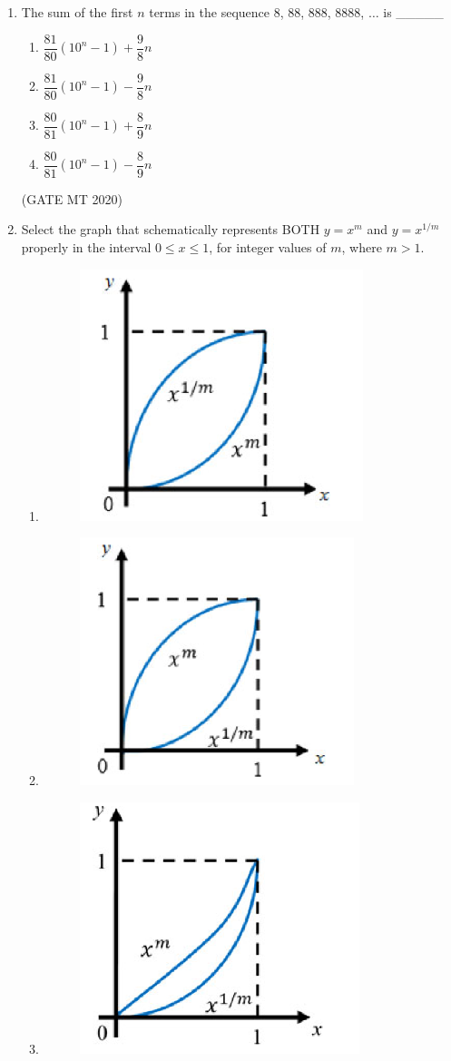 \documentclass[journal, 11pt, onecolumn]{IEEEtran}
\theoremstyle{remark}
\begin{document}
\begin{enumerate}
\item The sum of the first $n$ terms in the sequence 8, 88, 888, 8888, $\dots$ is \_\_\_\_\_

\begin{multicols}{2}
\begin{enumerate}
\item $\dfrac{81}{80}(10^{n}-1) + \dfrac{9}{8}n$  
\item $\dfrac{81}{80}(10^{n}-1) - \dfrac{9}{8}n$  
\item $\dfrac{80}{81}(10^{n}-1) + \dfrac{8}{9}n$  
\item $\dfrac{80}{81}(10^{n}-1) - \dfrac{8}{9}n$  
\end{enumerate}
\end{multicols}
\hfill(GATE MT 2020)

\item Select the graph that schematically represents BOTH $y = x^{m}$ and $y = x^{1/m}$ properly in the interval $0 \leq x \leq 1$, for integer values of $m$, where $m > 1$.
\begin{enumerate}
\item \begin{figure}[H]
    \centering
    \includegraphics[width=0.25\linewidth]{figs/image1''.png}
    \caption{}
    \label{fig:placeholder}
\end{figure}  
\item \begin{figure}[H]
    \centering
    \includegraphics[width=0.25\linewidth]{figs/image2''.png}
    \caption{}
    \label{fig:placeholder}
\end{figure}  
\item \begin{figure}[H]
    \centering
    \includegraphics[width=0.25\linewidth]{figs/image3''.png}

\end{figure}
\end{enumerate}
\end{enumerate}
\end{document}
